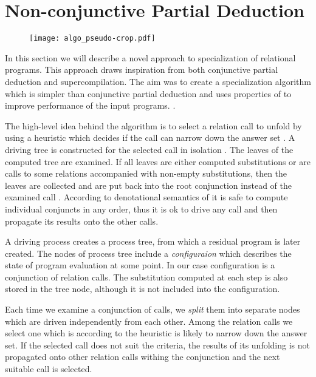 \section{Non-conjunctive Partial Deduction}

\begin{figure}[!t]
  \centering
  \texttt{[image: algo\_pseudo-crop.pdf]}
  \caption{}
  \label{fig:ncpd-pseudo}
\end{figure}

In this section we will describe a novel approach to specialization of relational programs.
This approach draws inspiration from both conjunctive partial deduction and supercompilation.
The aim was to create a specialization algorithm which is simpler than conjunctive partial deduction and uses properties of \mk{} to improve performance of the input programs.
.

The high-level idea behind the algorithm is to select a relation call to unfold by using a heuristic which decides if the call can narrow down the answer set .
A driving tree is constructed for the selected call in isolation .
The leaves of the computed tree are examined.
If all leaves are either computed substitutions or are calls to some relations accompanied with non-empty substitutions, then the leaves are collected and are put back into the root conjunction instead of the examined call .
According to denotational semantics of \mk{} it is safe to compute individual conjuncts in any order, thus it is ok to drive any call and then propagate its results onto the other calls.

A driving process creates a process tree, from which a residual program is later created.
The nodes of process tree include a \emph{configuraion} which describes the state of program evaluation at some point.
In our case configuration is a conjunction of relation calls.
The substitution computed at each step is also stored in the tree node, although it is not included into the configuration.

Each time we examine a conjunction of calls, we \emph{split} them into separate nodes which are driven independently from each other.
Among the relation calls we select one which is according to the heuristic is likely to narrow down the answer set.
If the selected call does not suit the criteria, the results of its unfolding is not propagated onto other relation calls withing the conjunction and the next suitable call is selected.

